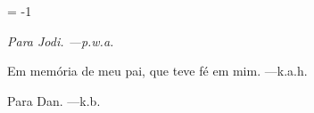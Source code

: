 %




\pageno = -1


% 
{}

\noheadlinetrue\pagebreak


% 
\blankpage

\blankpage


{ }
\noheadlinetrue


% 
\sinkage
{\it \flushright
   Para Jodi.
   ---{\sc p.w.a.}
   
   Em memória de meu pai,
   que teve fé em mim.
   ---{\sc k.a.h.}
   
   Para Dan.
   ---{\sc k.b.}
}
\pagebreak



\blankpage
{ }

% 
% 
\rewritetocfilefalse
%
\blankpage
{}

\shortcontents


\ifcompletebook \global\rewritetocfiletrue \fi


\contents

\blankpage
{ }

\byebye
